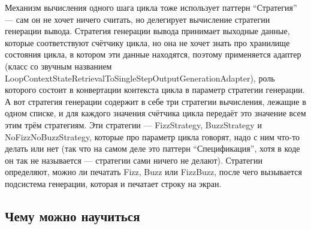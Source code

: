 \documentclass[a5paper]{article}
\begin{document}
Механизм вычисления одного шага цикла тоже использует паттерн ``Стратегия'' --- сам он не хочет ничего считать, но делегирует вычисление стратегии генерации вывода. Стратегия генерации вывода принимает выходные данные, которые соответствуют счётчику цикла, но она не хочет знать про хранилище состояния цикла, в котором эти данные находятся, поэтому применяется адаптер (класс со звучным названием LoopContextStateRetrievalToSingleStepOutputGenerationAdapter), роль которого состоит в конвертации контекста цикла в параметр стратегии генерации. А вот стратегия генерации содержит в себе три стратегии вычисления, лежащие в одном списке, и для каждого значения счётчика цикла передаёт это значение всем этим трём стратегиям. Эти стратегии --- FizzStrategy, BuzzStrategy и NoFizzNoBuzzStrategy, которые про параметр цикла говорят, надо с ним что-то делать или нет (так что на самом деле это паттерн ``Спецификация'', хотя в коде он так не называется --- стратегии сами ничего не делают). Стратегии определяют, можно ли печатать Fizz, Buzz или FizzBuzz, после чего вызывается подсистема генерации, которая и печатает строку на экран.

\subsection{Чему можно научиться}
\end{document}
